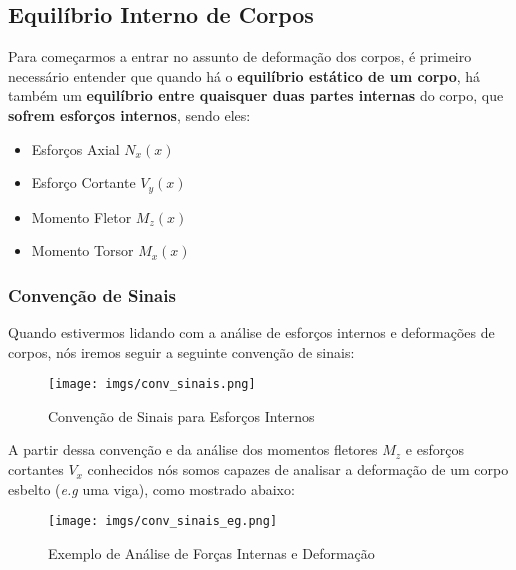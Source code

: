 \documentclass{article}
\begin{document}
        \newpage
        \subsection{Equilíbrio Interno de Corpos}
            Para começarmos a entrar no assunto de deformação dos corpos, é primeiro necessário entender que quando há o \textbf{equilíbrio estático de um corpo}, há também um \textbf{equilíbrio entre quaisquer duas
            partes internas} do corpo, que \textbf{sofrem esforços internos}, sendo eles:
            \begin{itemize}
                \item Esforços Axial $N_x(x)$
                \item Esforço Cortante $V_y(x)$
                \item Momento Fletor $M_z(x)$
                \item Momento Torsor $M_x(x)$
            \end{itemize}

            \subsubsection{Convenção de Sinais}
                Quando estivermos lidando com a análise de esforços internos e deformações de corpos, nós iremos seguir a seguinte convenção de sinais:
                \begin{figure}[h]
                    \centering
                    \texttt{[image: imgs/conv\_sinais.png]}
                    \caption{Convenção de Sinais para Esforços Internos}
                    \label{fig:conv_de_sinais_esf_intern}
                \end{figure}


                A partir dessa convenção e da análise dos momentos fletores $M_z$ e esforços cortantes $V_x$ conhecidos nós somos capazes de analisar a deformação de um corpo esbelto (\emph{e.g} uma viga),
                como mostrado abaixo:
                \begin{figure}[h]
                    \centering
                    \texttt{[image: imgs/conv\_sinais\_eg.png]}
                    \caption{Exemplo de Análise de Forças Internas e Deformação}
                \end{figure}
\end{document}

